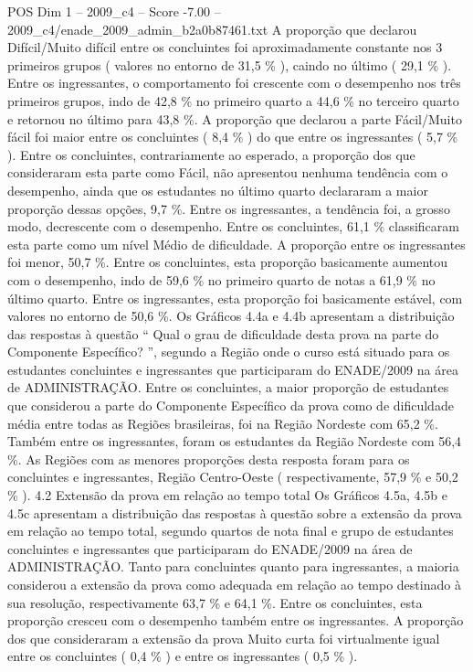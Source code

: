 \begin{textsample}{POS Dim 1 – 2009\_c4 – Score -7.00 – 2009\_c4/enade\_2009\_admin\_b2a0b87461.txt}
A proporção que declarou Difícil/Muito difícil entre os concluintes foi aproximadamente constante nos 3 primeiros grupos ( valores no entorno de 31,5 \% ), caindo no último ( 29,1 \% ).
Entre os ingressantes, o comportamento foi crescente com o desempenho nos três primeiros grupos, indo de 42,8 \% no primeiro quarto a 44,6 \% no terceiro quarto e retornou no último para 43,8 \%.
A proporção que declarou a parte Fácil/Muito fácil foi maior entre os concluintes ( 8,4 \% ) do que entre os ingressantes ( 5,7 \% ).
Entre os concluintes, contrariamente ao esperado, a proporção dos que consideraram esta parte como Fácil, não apresentou nenhuma tendência com o desempenho, ainda que os estudantes no último quarto declararam a maior proporção dessas opções, 9,7 \%.
Entre os ingressantes, a tendência foi, a grosso modo, decrescente com o desempenho.
Entre os concluintes, 61,1 \% classificaram esta parte como um nível Médio de dificuldade.
A proporção entre os ingressantes foi menor, 50,7 \%.
Entre os concluintes, esta proporção basicamente aumentou com o desempenho, indo de 59,6 \% no primeiro quarto de notas a 61,9 \% no último quarto.
Entre os ingressantes, esta proporção foi basicamente estável, com valores no entorno de 50,6 \%.
Os Gráficos 4.4a e 4.4b apresentam a distribuição das respostas à questão “ Qual o grau de dificuldade desta prova na parte do Componente Específico? ”, segundo a Região onde o curso está situado para os estudantes concluintes e ingressantes que participaram do ENADE/2009 na área de ADMINISTRAÇÃO.
Entre os concluintes, a maior proporção de estudantes que considerou a parte do Componente Específico da prova como de dificuldade média entre todas as Regiões brasileiras, foi na Região Nordeste com 65,2 \%.
Também entre os ingressantes, foram os estudantes da Região Nordeste com 56,4 \%.
As Regiões com as menores proporções desta resposta foram para os concluintes e ingressantes, Região Centro-Oeste ( respectivamente, 57,9 \% e 50,2 \% ). 4.2 Extensão da prova em relação ao tempo total Os Gráficos 4.5a, 4.5b e 4.5c apresentam a distribuição das respostas à questão sobre a extensão da prova em relação ao tempo total, segundo quartos de nota final e grupo de estudantes concluintes e ingressantes que participaram do ENADE/2009 na área de ADMINISTRAÇÃO.
Tanto para concluintes quanto para ingressantes, a maioria considerou a extensão da prova como adequada em relação ao tempo destinado à sua resolução, respectivamente 63,7 \% e 64,1 \%.
Entre os concluintes, esta proporção cresceu com o desempenho também entre os ingressantes.
A proporção dos que consideraram a extensão da prova Muito curta foi virtualmente igual entre os concluintes ( 0,4 \% ) e entre os ingressantes ( 0,5 \% ).

\end{textsample}
